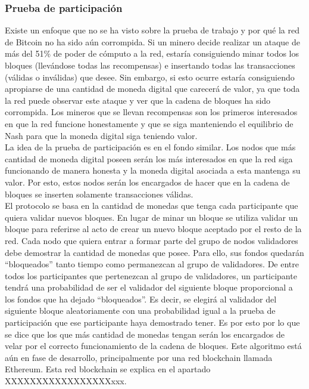 \subsubsection{Prueba de participación}
Existe un enfoque que no se ha visto sobre la prueba de trabajo y por qué la red de Bitcoin no ha sido aún corrompida. Si un minero decide realizar un ataque de más del 51\% de poder de cómputo a la red, estaría consiguiendo minar todos los bloques (llevándose todas las recompensas) e insertando todas las transacciones (válidas o inválidas) que desee. Sin embargo, si esto ocurre estaría consiguiendo apropiarse de una cantidad de moneda digital que carecerá de valor, ya que toda la red puede observar este ataque y ver que la cadena de bloques ha sido corrompida. Los mineros que se llevan recompensas son los primeros interesados en que la red funcione honestamente y que se siga manteniendo el equilibrio de Nash para que la moneda digital siga teniendo valor. \\
La idea de la prueba de participación es en el fondo similar. Los nodos que más cantidad de moneda digital poseen serán los más interesados en que la red siga funcionando de manera honesta y la moneda digital asociada a esta mantenga su valor. Por esto, estos nodos serán los encargados de hacer que en la cadena de bloques se inserten solamente transacciones válidas. \\
El protocolo se basa en la cantidad de monedas que tenga cada participante que quiera validar nuevos bloques. En lugar de minar un bloque se utiliza validar un bloque para referirse al acto de crear un nuevo bloque aceptado por el resto de la red. Cada nodo que quiera entrar a formar parte del grupo de nodos validadores debe demostrar la cantidad de monedas que posee. Para ello, sus fondos quedarán “bloqueados” tanto tiempo como permanezcan al grupo de validadores. De entre todos los participantes que pertenezcan al grupo de validadores, un participante tendrá una probabilidad de ser el validador del siguiente bloque proporcional a los fondos que ha dejado “bloqueados”. Es decir, se elegirá al validador del siguiente bloque aleatoriamente con una probabilidad igual a la prueba de participación que ese participante haya demostrado tener. Es por esto por lo que se dice que los que más cantidad de monedas tengan serán los encargados de velar por el correcto funcionamiento de la cadena de bloques.
Este algoritmo está aún en fase de desarrollo, principalmente por una red blockchain llamada Ethereum. Esta red blockchain se explica en el apartado XXXXXXXXXXXXXXXXXxxx.

